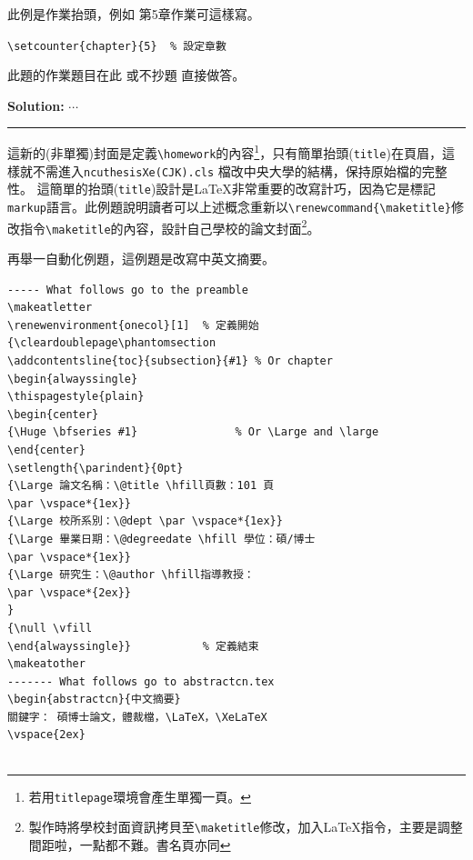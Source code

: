 \begin{appendB}
此例是作業抬頭，例如 第5章作業可這樣寫。

\verb|\setcounter{chapter}{5}  % 設定章數|
\setcounter{chapter}{5}
\begin{pr}
此題的作業題目在此 或不抄題 直接做答。

{\bf Solution:}
$\cdots$
\end{pr}

\rule{\linewidth}{0.5mm} 

這新的(非單獨)封面是定義\verb|\homework|的內容\footnote{若用{\tt titlepage}環境會產生單獨一頁。}，只有簡單抬頭({\tt title})在頁眉，這樣就不需進入{\tt ncuthesisXe(CJK).cls}
檔改中央大學的結構，保持原始檔的完整性。
這簡單的抬頭({\tt title})設計是\LaTeX 非常重要的改寫計巧，因為它是標記{\tt markup}語言。此例題說明讀者可以上述概念重新以\verb|\renewcommand{\maketitle}|修改指令\verb|\maketitle|的內容，設計自己學校的論文封面\footnote{製作時將學校封面資訊拷貝至{\tt \textbackslash maketitle}修改，加入\LaTeX 指令，主要是調整間距啦，一點都不難。書名頁亦同}。\par


再舉一自動化例題，這例題是改寫中英文摘要。

\begin{Verbatim}[frame=single,firstline=1,lastline=50,rulecolor=\color{red},label=New abstract]
----- What follows go to the preamble
\makeatletter
\renewenvironment{onecol}[1]  % 定義開始
{\cleardoublepage\phantomsection
\addcontentsline{toc}{subsection}{#1} % Or chapter
\begin{alwayssingle}
\thispagestyle{plain}
\begin{center}
{\Huge \bfseries #1}               % Or \Large and \large
\end{center}
\setlength{\parindent}{0pt}
{\Large 論文名稱：\@title \hfill頁數：101 頁
\par \vspace*{1ex}}
{\Large 校所系別：\@dept \par \vspace*{1ex}}
{\Large 畢業日期：\@degreedate \hfill 學位：碩/博士 
\par \vspace*{1ex}}
{\Large 研究生：\@author \hfill指導教授：
\par \vspace*{2ex}}
}
{\null \vfill
\end{alwayssingle}}           % 定義結束
\makeatother
------- What follows go to abstractcn.tex
\begin{abstractcn}{中文摘要}
關鍵字： 碩博士論文，體裁檔，\LaTeX，\XeLaTeX
\vspace{2ex}


\end{Verbatim}
\end{appendB}
